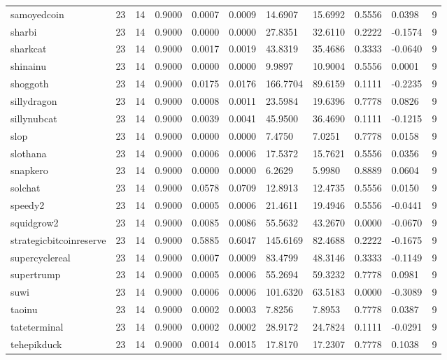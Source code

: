 \begin{table}[htbp]
\begin{tabular}{lllllllllll}
samoyedcoin & 23 & 14 & 0.9000 & 0.0007 & 0.0009 & 14.6907 & 15.6992 & 0.5556 & 0.0398 & 9 \\
sharbi & 23 & 14 & 0.9000 & 0.0000 & 0.0000 & 27.8351 & 32.6110 & 0.2222 & -0.1574 & 9 \\
sharkcat & 23 & 14 & 0.9000 & 0.0017 & 0.0019 & 43.8319 & 35.4686 & 0.3333 & -0.0640 & 9 \\
shinainu & 23 & 14 & 0.9000 & 0.0000 & 0.0000 & 9.9897 & 10.9004 & 0.5556 & 0.0001 & 9 \\
shoggoth & 23 & 14 & 0.9000 & 0.0175 & 0.0176 & 166.7704 & 89.6159 & 0.1111 & -0.2235 & 9 \\
sillydragon & 23 & 14 & 0.9000 & 0.0008 & 0.0011 & 23.5984 & 19.6396 & 0.7778 & 0.0826 & 9 \\
sillynubcat & 23 & 14 & 0.9000 & 0.0039 & 0.0041 & 45.9500 & 36.4690 & 0.1111 & -0.1215 & 9 \\
slop & 23 & 14 & 0.9000 & 0.0000 & 0.0000 & 7.4750 & 7.0251 & 0.7778 & 0.0158 & 9 \\
slothana & 23 & 14 & 0.9000 & 0.0006 & 0.0006 & 17.5372 & 15.7621 & 0.5556 & 0.0356 & 9 \\
snapkero & 23 & 14 & 0.9000 & 0.0000 & 0.0000 & 6.2629 & 5.9980 & 0.8889 & 0.0604 & 9 \\
solchat & 23 & 14 & 0.9000 & 0.0578 & 0.0709 & 12.8913 & 12.4735 & 0.5556 & 0.0150 & 9 \\
speedy2 & 23 & 14 & 0.9000 & 0.0005 & 0.0006 & 21.4611 & 19.4946 & 0.5556 & -0.0441 & 9 \\
squidgrow2 & 23 & 14 & 0.9000 & 0.0085 & 0.0086 & 55.5632 & 43.2670 & 0.0000 & -0.0670 & 9 \\
strategicbitcoinreserve & 23 & 14 & 0.9000 & 0.5885 & 0.6047 & 145.6169 & 82.4688 & 0.2222 & -0.1675 & 9 \\
supercyclereal & 23 & 14 & 0.9000 & 0.0007 & 0.0009 & 83.4799 & 48.3146 & 0.3333 & -0.1149 & 9 \\
supertrump & 23 & 14 & 0.9000 & 0.0005 & 0.0006 & 55.2694 & 59.3232 & 0.7778 & 0.0981 & 9 \\
suwi & 23 & 14 & 0.9000 & 0.0006 & 0.0006 & 101.6320 & 63.5183 & 0.0000 & -0.3089 & 9 \\
taoinu & 23 & 14 & 0.9000 & 0.0002 & 0.0003 & 7.8256 & 7.8953 & 0.7778 & 0.0387 & 9 \\
tateterminal & 23 & 14 & 0.9000 & 0.0002 & 0.0002 & 28.9172 & 24.7824 & 0.1111 & -0.0291 & 9 \\
tehepikduck & 23 & 14 & 0.9000 & 0.0014 & 0.0015 & 17.8170 & 17.2307 & 0.7778 & 0.1038 & 9 \\

\end{tabular}
\end{table}
